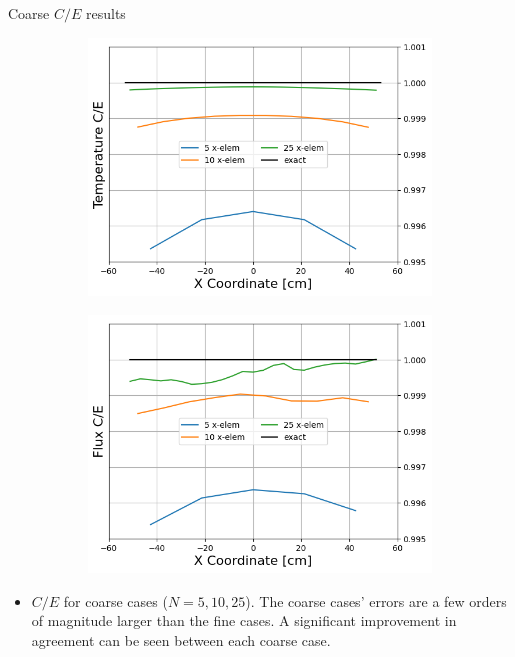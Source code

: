 \documentclass[9pt,t]{beamer}
\begin{document}
\begin{frame}{Coarse $C/E$ results}
    \begin{figure}[T]
        \begin{subfigure}{0.475\linewidth}
            \includegraphics[height=0.8\linewidth]{figures/coarse_temp_num_to_analy_ratios.png}
        \end{subfigure}\hspace{0.3cm}
        \begin{subfigure}{0.475\linewidth}
            \includegraphics[height=0.8\linewidth]{figures/coarse_flux_num_to_analy_ratios.png}
        \end{subfigure}
    \end{figure}
    \begin{itemize}
        \item $C/E$ for coarse cases ($N=5,10,25$). The coarse cases' errors are a few orders of magnitude larger than the fine cases. A significant improvement in agreement can be seen between each coarse case.
    \end{itemize}
\end{frame}
\end{document}
